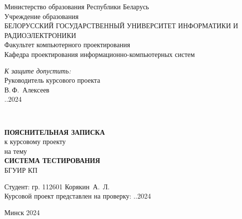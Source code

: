 
\begin{titlepage}
\begin{center}
Министерство образования Республики Беларусь\\[1.2em]
Учреждение образования\\[0.4em]
БЕЛОРУССКИЙ ГОСУДАРСТВЕННЫЙ УНИВЕРСИТЕТ ИНФОРМАТИКИ И РАДИОЭЛЕКТРОНИКИ\\[2.0em]
Факультет компьютерного проектирования\\
Кафедра проектирования информационно-компьютерных систем

\end{center}

\begin{flushright}
  \begin{minipage}{0.5\textwidth}
    \textit{К защите допустить:}\\
    Руководитель курсового проекта\\

    \underline{\hspace*{2.8cm}} В.\,Ф.~Алексеев\\
    \underline{\hspace*{1.4cm}}.\underline{\hspace*{1.4cm}}.2024
  \end{minipage}\\[2em]
\end{flushright}

\begin{center}
  \textbf{ПОЯСНИТЕЛЬНАЯ ЗАПИСКА}\\
  к курсовому проекту\\
  на тему\\[2.0em]

  \textbf{СИСТЕМА ТЕСТИРОВАНИЯ}\\
  БГУИР КП%
\end{center}

\begin{flushright}
    \begin{minipage}{9.3cm}
        Студент:  гр. 112601 Корякин~А.~Л.\\[0.1em]

        Курсовой проект представлен на проверку: \underline{\hspace*{1.4cm}}.\underline{\hspace*{1.4cm}}.2024\\
        \underline{\hspace*{5.6cm}}
        
    \end{minipage}
  \end{flushright}
  
  \vfill
  \begin{center}
    {\normalsize Минск 2024}
    \end{center}
\end{titlepage}


